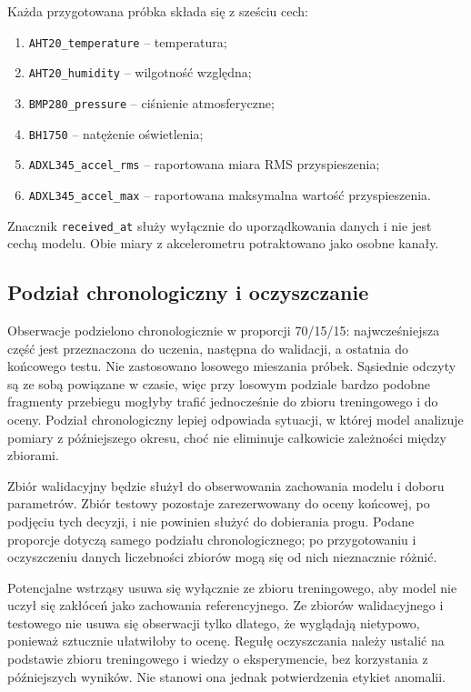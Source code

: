 \documentclass[12pt,a4paper]{article}
\begin{document}
Każda przygotowana próbka składa się z sześciu cech:
\begin{enumerate}
	\item \texttt{AHT20\_temperature} -- temperatura;
	\item \texttt{AHT20\_humidity} -- wilgotność względna;
	\item \texttt{BMP280\_pressure} -- ciśnienie atmosferyczne;
	\item \texttt{BH1750} -- natężenie oświetlenia;
	\item \texttt{ADXL345\_accel\_rms} -- raportowana miara RMS przyspieszenia;
	\item \texttt{ADXL345\_accel\_max} -- raportowana maksymalna wartość przyspieszenia.
\end{enumerate}
Znacznik \texttt{received\_at} służy wyłącznie do uporządkowania danych i nie jest cechą modelu. Obie miary z akcelerometru potraktowano jako osobne kanały.

\subsection{Podział chronologiczny i oczyszczanie}
Obserwacje podzielono chronologicznie w proporcji 70/15/15: najwcześniejsza część jest przeznaczona do uczenia, następna do walidacji, a ostatnia do końcowego testu. Nie zastosowano losowego mieszania próbek. Sąsiednie odczyty są ze sobą powiązane w czasie, więc przy losowym podziale bardzo podobne fragmenty przebiegu mogłyby trafić jednocześnie do zbioru treningowego i do oceny. Podział chronologiczny lepiej odpowiada sytuacji, w której model analizuje pomiary z późniejszego okresu, choć nie eliminuje całkowicie zależności między zbiorami.

Zbiór walidacyjny będzie służył do obserwowania zachowania modelu i doboru parametrów. Zbiór testowy pozostaje zarezerwowany do oceny końcowej, po podjęciu tych decyzji, i nie powinien służyć do dobierania progu. Podane proporcje dotyczą samego podziału chronologicznego; po przygotowaniu i oczyszczeniu danych liczebności zbiorów mogą się od nich nieznacznie różnić.

Potencjalne wstrząsy usuwa się wyłącznie ze zbioru treningowego, aby model nie uczył się zakłóceń jako zachowania referencyjnego. Ze zbiorów walidacyjnego i testowego nie usuwa się obserwacji tylko dlatego, że wyglądają nietypowo, ponieważ sztucznie ułatwiłoby to ocenę. Regułę oczyszczania należy ustalić na podstawie zbioru treningowego i wiedzy o eksperymencie, bez korzystania z późniejszych wyników. Nie stanowi ona jednak potwierdzenia etykiet anomalii.
\end{document}
